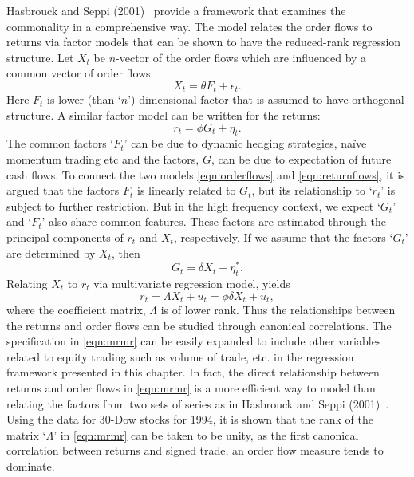 Hasbrouck and Seppi (2001)~\cite{seppi2001} provide a framework that examines the commonality in a comprehensive way. The model relates the order flows to returns via factor models that can be shown to have the reduced-rank regression structure. Let $X_t$ be $n$-vector of the order flows which are influenced by a common vector of order flows:
	\begin{equation} \label{eqn:orderflows}
	X_t= \theta F_t + \epsilon_t.
	\end{equation}
Here $F_t$ is lower (than `$n$') dimensional factor that is assumed to have orthogonal structure. A similar factor model can be written for the returns:
	\begin{equation} \label{eqn:returnflows}
	r_t= \phi G_t + \eta_t.
	\end{equation}
The common factors `$F_t$' can be due to dynamic hedging strategies, na\"{i}ve momentum trading etc and the factors, $G$, can be due to expectation of future cash flows. To connect the two models \eqref{eqn:orderflows} and \eqref{eqn:returnflows}, it is argued that the factors $F_t$ is linearly related to $G_t$, but its relationship to `$r_t$' is subject to further restriction. But in the high frequency context, we expect `$G_t$' and `$F_t$' also share common features. These factors are estimated through the principal components of $r_t$ and $X_t$, respectively. If we assume that the factors `$G_t$' are determined by $X_t$, then
	\begin{equation} \label{eqn:determinedfactors}
	G_t= \delta X_t + \eta_t^*.
	\end{equation}
Relating $X_t$ to $r_t$ via multivariate regression model, yields 
	\begin{equation} \label{eqn:mrmr}
	r_t= \Lambda X_t + u_t = \phi \delta X_t + u_t,
	\end{equation}
where the coefficient matrix, $\Lambda$ is of lower rank. Thus the relationships between the returns and order flows can be studied through canonical correlations. The specification in \eqref{eqn:mrmr} can be easily expanded to include other variables related to equity trading such as volume of trade, etc. in the regression framework presented in this chapter. In fact, the direct relationship between returns and order flows in \eqref{eqn:mrmr} is a more efficient way to model than relating the factors from two sets of series as in Hasbrouck and Seppi (2001)~\cite{seppi2001}. Using the data for 30-Dow stocks for 1994, it is shown that the rank of the matrix `$\Lambda$' in \eqref{eqn:mrmr} can be taken to be unity, as the first canonical correlation between returns and signed trade, an order flow measure tends to dominate.



